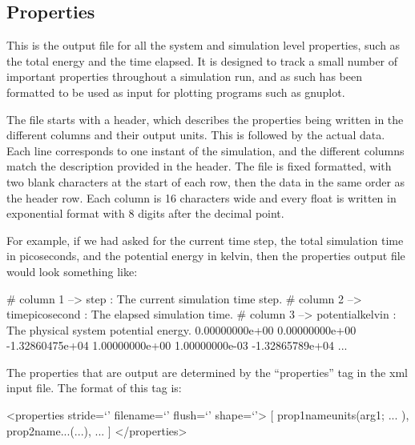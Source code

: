 \documentclass[11pt,english,fleqn]{report}
\newenvironment{code}{%
\footnotesize 
\verbatim
}{
\endverbatim
\normalsize
}
\begin{document}
\subsection{Properties}

\label{propertyfile}

This is the output file for all the system and simulation level properties,
such as the total energy and the time elapsed. It is designed to 
track a small number of important properties throughout a
simulation run, and as such has been formatted to be used as input
for plotting programs such as gnuplot.

The file starts with
a header, which describes the properties being written in the different
columns and their output units. This is followed by the actual
data. Each line corresponds to one instant of the simulation, and
the different columns match the description provided in the header.
The file is fixed formatted, with two blank characters at the start
of each row, then the data in the same order as the header row. Each
column is 16 characters wide and every float is written in exponential
format with 8 digits after the decimal point.

For example, if we had asked for the current time step, the total
simulation time in picoseconds, and the potential energy in kelvin,
then the properties output file would look something like:

\begin{code}
# column   1     --> step : The current simulation time step.
# column   2     --> time{picosecond} : The elapsed simulation time.
# column   3     --> potential{kelvin} : The physical system potential energy.
    0.00000000e+00     0.00000000e+00    -1.32860475e+04
    1.00000000e+00     1.00000000e-03    -1.32865789e+04
...
\end{code}

The properties that are output are determined by the {}``properties''
tag in the xml input file. The format of this tag is:

\begin{code}<properties stride=`' filename=`' flush=`' shape=`'>
   [ prop1name{units}(arg1; ... ), prop2name{...}(...), ...  ]
</properties>\end{code}
\end{document}
